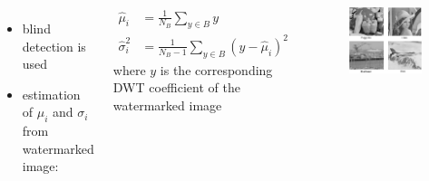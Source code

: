 \begin{frame}{\insertsection}
\begin{columns}
	\begin{itemize}
	\item blind detection is used
	\item estimation of $\mu_i$ and $\sigma_i$ from watermarked image:
	\end{itemize}
	\begin{align*}
	\hat{\mu}_i &= \frac{1}{N_B} \sum_{y \in B}y\\
	\hat{\sigma}_i^2 &= \frac{1}{N_B - 1} \sum_{y\in B}(y-\hat{\mu}_i)^2
	\end{align*}
where $y$ is the corresponding DWT coefficient of the watermarked image
	\begin{figure}
	\centering
	\includegraphics[width=\textwidth]{Bilder/ResultsBilder} 
	\end{figure}
	\end{columns}
\end{frame}

